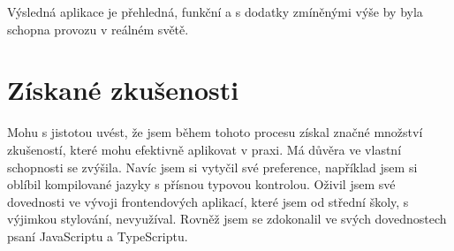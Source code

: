 Výsledná aplikace je přehledná, funkční a s dodatky zmíněnými výše by byla schopna provozu v reálném světě. 

\section{Získané zkušenosti}
Mohu s jistotou uvést, že jsem během tohoto procesu získal značné množství zkušeností, které mohu efektivně aplikovat v praxi. Má důvěra ve vlastní schopnosti se zvýšila. Navíc jsem si vytyčil své preference, například jsem si oblíbil kompilované jazyky s přísnou typovou kontrolou. Oživil jsem své dovednosti ve vývoji frontendových aplikací, které jsem od střední školy, s výjimkou stylování, nevyužíval. Rovněž jsem se zdokonalil ve svých dovednostech psaní JavaScriptu a TypeScriptu.
